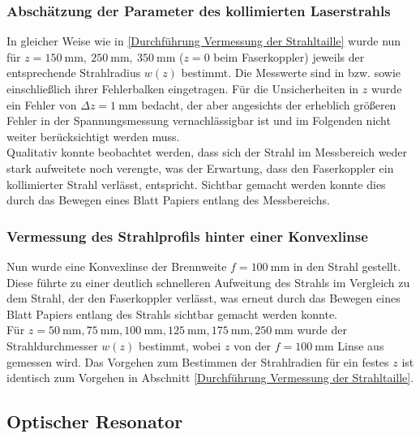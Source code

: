 \documentclass[11pt,a4paper,oneside]{scrartcl}
\begin{document}
\subsubsection{Abschätzung der Parameter des kollimierten Laserstrahls}
In gleicher Weise wie in \ref{Durchführung Vermessung der Strahltaille} wurde nun für $z=150\ \mathrm{mm},\ 250\ \mathrm{mm},\ 350\ \mathrm{mm}$ ($z=0$ beim Faserkoppler) jeweils der entsprechende Strahlradius $w(z)$ bestimmt. Die Messwerte sind in  bzw.  sowie  einschließlich ihrer Fehlerbalken eingetragen. Für die Unsicherheiten in $z$ wurde ein Fehler von $\Delta z=1\ \mathrm{mm}$ bedacht, der aber angesichts der erheblich größeren Fehler in der Spannungsmessung vernachlässigbar ist und im Folgenden nicht weiter berücksichtigt werden muss.\\
Qualitativ konnte beobachtet werden, dass sich der Strahl im Messbereich weder stark aufweitete noch verengte, was der Erwartung, dass den Faserkoppler ein kollimierter Strahl verlässt, entspricht. Sichtbar gemacht werden konnte dies durch das Bewegen eines Blatt Papiers entlang des Messbereichs.
\subsubsection{Vermessung des Strahlprofils hinter einer Konvexlinse}
Nun wurde eine Konvexlinse der Brennweite $f=100\ \mathrm{mm}$ in den Strahl gestellt. Diese führte zu einer deutlich schnelleren Aufweitung des Strahls im Vergleich zu dem Strahl, der den Faserkoppler verlässt, was erneut durch das Bewegen eines Blatt Papiers entlang des Strahls sichtbar gemacht werden konnte. \\
Für $z=50\ \mathrm{mm},75\ \mathrm{mm},100\ \mathrm{mm},125\ \mathrm{mm},175\ \mathrm{mm}, 250\ \mathrm{mm}$ wurde der Strahldurchmesser $w(z)$ bestimmt, wobei $z$ von der $f=100\ \mathrm{mm}$ Linse aus gemessen wird. Das Vorgehen zum Bestimmen der Strahlradien für ein festes $z$ ist identisch zum Vorgehen in Abschnitt \ref{Durchführung Vermessung der Strahltaille}.
\subsection{Optischer Resonator}
\end{document}
